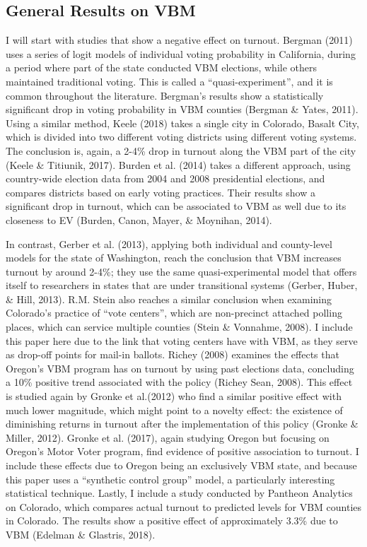 \documentclass[12pt,twoside]{reedthesis}
\begin{document}
  \subsection{General Results on VBM}\label{general-results-on-vbm}
  
  I will start with studies that show a negative effect on turnout.
  Bergman (2011) uses a series of logit models of individual voting
  probability in California, during a period where part of the state
  conducted VBM elections, while others maintained traditional voting.
  This is called a ``quasi-experiment'', and it is common throughout the
  literature. Bergman's results show a statistically significant drop in
  voting probability in VBM counties (Bergman \& Yates, 2011). Using a
  similar method, Keele (2018) takes a single city in Colorado, Basalt
  City, which is divided into two different voting districts using
  different voting systems. The conclusion is, again, a 2-4\% drop in
  turnout along the VBM part of the city (Keele \& Titiunik, 2017). Burden
  et al. (2014) takes a different approach, using country-wide election
  data from 2004 and 2008 presidential elections, and compares districts
  based on early voting practices. Their results show a significant drop
  in turnout, which can be associated to VBM as well due to its closeness
  to EV (Burden, Canon, Mayer, \& Moynihan, 2014).
  
  In contrast, Gerber et al. (2013), applying both individual and
  county-level models for the state of Washington, reach the conclusion
  that VBM increases turnout by around 2-4\%; they use the same
  quasi-experimental model that offers itself to researchers in states
  that are under transitional systems (Gerber, Huber, \& Hill, 2013). R.M.
  Stein also reaches a similar conclusion when examining Colorado's
  practice of ``vote centers'', which are non-precinct attached polling
  places, which can service multiple counties (Stein \& Vonnahme, 2008). I
  include this paper here due to the link that voting centers have with
  VBM, as they serve as drop-off points for mail-in ballots. Richey (2008)
  examines the effects that Oregon's VBM program has on turnout by using
  past elections data, concluding a 10\% positive trend associated with
  the policy (Richey Sean, 2008). This effect is studied again by Gronke
  et al.(2012) who find a similar positive effect with much lower
  magnitude, which might point to a novelty effect: the existence of
  diminishing returns in turnout after the implementation of this policy
  (Gronke \& Miller, 2012). Gronke et al. (2017), again studying Oregon
  but focusing on Oregon's Motor Voter program, find evidence of positive
  association to turnout. I include these effects due to Oregon being an
  exclusively VBM state, and because this paper uses a ``synthetic control
  group'' model, a particularly interesting statistical technique. Lastly,
  I include a study conducted by Pantheon Analytics on Colorado, which
  compares actual turnout to predicted levels for VBM counties in
  Colorado. The results show a positive effect of approximately 3.3\% due
  to VBM (Edelman \& Glastris, 2018).
  
\end{document}
